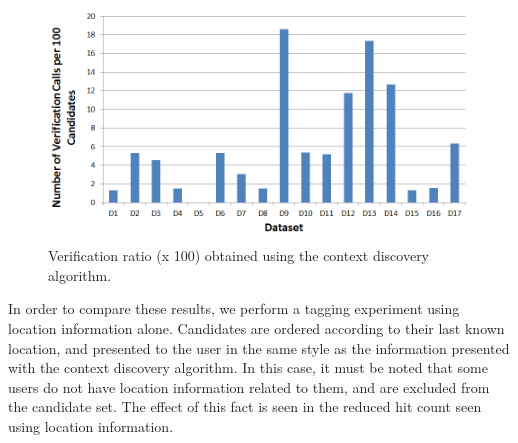 \begin{figure}[t]
\centering
\includegraphics[width=\textwidth]{media/chapter5/axis/cx-verification-ratio-all-datasets.png}
\caption{Verification ratio (x 100) obtained using the context discovery algorithm.}
\label{fig:exp-cx-verification-ratio}
\end{figure}

In order to compare these results, we perform a tagging experiment using location information alone. Candidates are ordered according to their last known location, and presented to the user in the same style as the information presented with the context discovery algorithm. In this case, it must be noted that some users do not have location information related to them, and are excluded from the candidate set. The effect of this fact is seen in the reduced hit count seen using location information.



